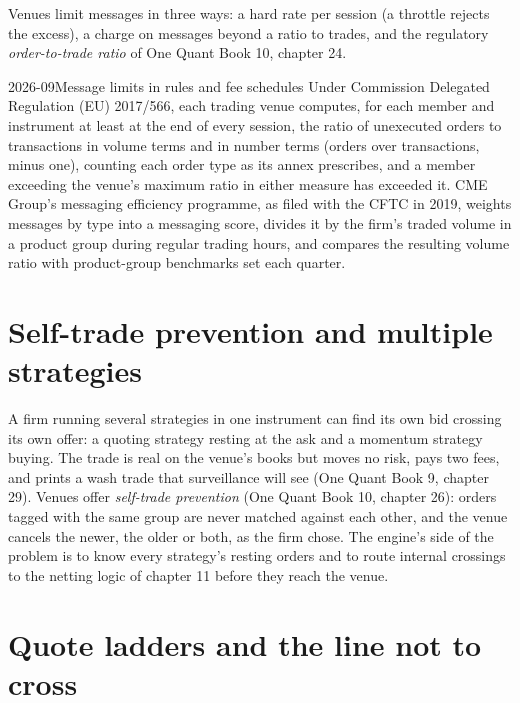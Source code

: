 Venues limit messages in three ways: a hard rate per session (a throttle rejects the excess), a charge on messages beyond a ratio to trades, and the
regulatory \emph{order-to-trade ratio} of One Quant Book 10, chapter 24.

\begin{dated}{2026-09}{Message limits in rules and fee schedules}\label{dat:hf:the-quoting-engine:limits}
Under Commission Delegated Regulation (EU) 2017/566, each trading venue computes, for each member and instrument at least at the end of every
session, the ratio of unexecuted orders to transactions in volume terms and in number terms (orders over transactions, minus one), counting each order
type as its annex prescribes, and a member exceeding the venue's maximum ratio in either measure has exceeded it. CME Group's messaging efficiency
programme, as filed with the CFTC in 2019, weights messages by type into a messaging score, divides it by the firm's traded volume in a product group
during regular trading hours, and compares the resulting volume ratio with product-group benchmarks set each quarter.
\end{dated}

\section{Self-trade prevention and multiple strategies}

A firm running several strategies in one instrument can find its own bid crossing its own offer: a quoting strategy resting at the ask and a
momentum strategy buying. The trade is real on the venue's books but moves no risk, pays two fees, and prints a wash trade that surveillance will
see (One Quant Book 9, chapter 29). Venues offer \emph{self-trade prevention} (One Quant Book 10, chapter 26): orders tagged with the same group are
never matched against each other, and the venue cancels the newer, the older or both, as the firm chose. The engine's side of the problem is to
know every strategy's resting orders and to route internal crossings to the netting logic of chapter 11 before they reach the venue.

\section{Quote ladders and the line not to cross}

